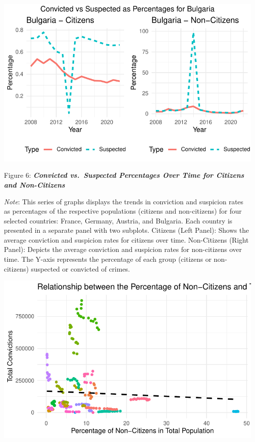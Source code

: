 \documentclass[
]{article}
\begin{document}
\includegraphics{DataMan_Project_files/figure-pdf/unnamed-chunk-30-4.pdf}

Figure 6: \textbf{\emph{Convicted vs.~Suspected Percentages Over Time
for Citizens and Non-Citizens}}

\emph{Note}: This series of graphs displays the trends in conviction and
suspicion rates as percentages of the respective populations (citizens
and non-citizens) for four selected countries: France, Germany, Austria,
and Bulgaria. Each country is presented in a separate panel with two
subplots. Citizens (Left Panel): Shows the average conviction and
suspicion rates for citizens over time. Non-Citizens (Right Panel):
Depicts the average conviction and suspicion rates for non-citizens over
time. The Y-axis represents the percentage of each group (citizens or
non-citizens) suspected or convicted of crimes.

\includegraphics{DataMan_Project_files/figure-pdf/unnamed-chunk-31-1.pdf}
\end{document}
